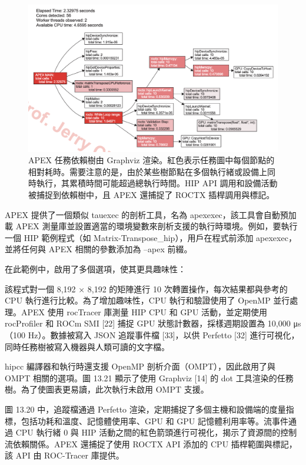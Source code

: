 \begin{figure}
    \centering
    \includegraphics[width=0.9\linewidth]{FileAusiliari/Screenshots/Figure13-21.png}
    \caption{APEX 任務依賴樹由 Graphviz 渲染。紅色表示任務圖中每個節點的相對耗時。需要注意的是，由於某些樹節點在多個執行緒或設備上同時執行，其累積時間可能超過總執行時間。HIP API 調用和設備活動被捕捉到依賴樹中，且 APEX 還捕捉了 ROCTX 插桿調用與標記。}
    \label{fig:PAPI21}
\end{figure}

APEX 提供了一個類似 tauexec 的剖析工具，名為 apexexec，該工具會自動預加載 APEX 測量庫並設置適當的環境變數來剖析支援的執行時環境。例如，要執行一個 HIP 範例程式（如 Matrix-Transpose\_hip），用戶在程式前添加 apexexec，並將任何與 APEX 相關的參數添加為 --apex 前綴。

在此範例中，啟用了多個選項，使其更具趣味性：

該程式對一個 8,192 × 8,192 的矩陣進行 10 次轉置操作，每次結果都與參考的 CPU 執行進行比較。為了增加趣味性，CPU 執行和驗證使用了 OpenMP 並行處理。APEX 使用 rocTracer 庫測量 HIP CPU 和 GPU 活動，並定期使用 rocProfiler 和 ROCm SMI [22] 捕捉 GPU 狀態計數器，採樣週期設置為 10,000 μs（100 Hz）。數據被寫入 JSON 追蹤事件檔 [33]，以供 Perfetto [32] 進行可視化，同時任務樹被寫入機器與人類可讀的文字檔。

hipcc 編譯器和執行時還支援 OpenMP 剖析介面（OMPT），因此啟用了與 OMPT 相關的選項。圖 13.21 顯示了使用 Graphviz [14] 的 dot 工具渲染的任務樹。為了使圖表更易讀，此次執行未啟用 OMPT 支援。

圖 13.20 中，追蹤檔通過 Perfetto 渲染，定期捕捉了多個主機和設備端的度量指標，包括功耗和溫度、記憶體使用率、GPU 和 GPU 記憶體利用率等。流事件通過 CPU 執行緒 0 與 HIP 活動之間的紅色箭頭進行可視化，揭示了資源間的控制流依賴關係。APEX 還捕捉了使用 ROCTX API 添加的 CPU 插桿範圍與標記，該 API 由 ROC-Tracer 庫提供。


